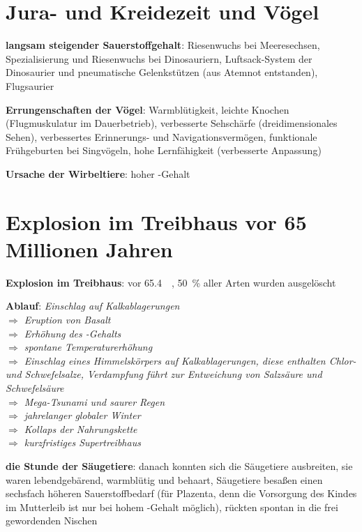 \section{%
    Jura- und Kreidezeit und Vögel%
}

\textbf{langsam steigender Sauerstoffgehalt}:
Riesenwuchs bei Meeresechsen,
Spezialisierung und Riesenwuchs bei Dinosauriern,
Luftsack-System der Dinosaurier und pneumatische Gelenkstützen (aus Atemnot entstanden),
Flugsaurier

\textbf{Errungenschaften der Vögel}:
Warmblütigkeit,
leichte Knochen (Flugmuskulatur im Dauerbetrieb),
verbesserte Sehschärfe (dreidimensionales Sehen),
verbessertes Erinnerungs- und Navigationsvermögen,
funktionale Frühgeburten bei Singvögeln,
hohe Lernfähigkeit (verbesserte Anpassung)

\textbf{Ursache der Wirbeltiere}:
hoher -Gehalt

\section{%
    Explosion im Treibhaus vor 65 Millionen Jahren%
}

\textbf{Explosion im Treibhaus}:
vor \SI{65.4}{\mega\year},
\SI{50}{\percent} aller Arten wurden ausgelöscht

\begin{wichtig}
    \item
    \textbf{Ablauf}:
    \emph{Einschlag auf Kalkablagerungen\\
    $\Rightarrow$ Eruption von Basalt\\
    $\Rightarrow$ Erhöhung des -Gehalts\\
    $\Rightarrow$ spontane Temperaturerhöhung\\
    $\Rightarrow$ Einschlag eines Himmelskörpers auf Kalkablagerungen,
    diese enthalten Chlor- und Schwefelsalze,
    Verdampfung führt zur Entweichung von Salzsäure und Schwefelsäure\\
    $\Rightarrow$ Mega-Tsunami und saurer Regen\\
    $\Rightarrow$ jahrelanger globaler Winter\\
    $\Rightarrow$ Kollaps der Nahrungskette\\
    $\Rightarrow$ kurzfristiges Supertreibhaus}
\end{wichtig}

\textbf{die Stunde der Säugetiere}:
danach konnten sich die Säugetiere ausbreiten,
sie waren lebendgebärend, warmblütig und behaart,
Säugetiere besaßen einen sechsfach höheren Sauerstoffbedarf
(für Plazenta, denn die Vorsorgung des Kindes im Mutterleib
ist nur bei hohem -Gehalt möglich),
rückten spontan in die frei gewordenden Nischen


